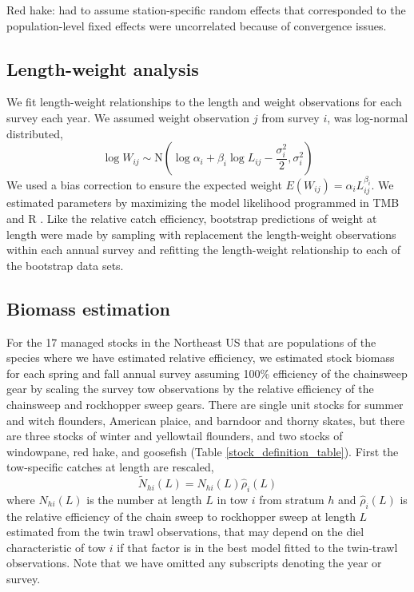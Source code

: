 \documentclass[]{article}
\begin{document}
Red hake: had to assume station-specific random effects that
corresponded to the population-level fixed effects were uncorrelated
because of convergence issues.

\hypertarget{length-weight-analysis}{%
\subsection{Length-weight analysis}\label{length-weight-analysis}}

We fit length-weight relationships to the length and weight observations
for each survey each year. We assumed weight observation \(j\) from
survey \(i\), was log-normal distributed, \begin{equation}\label{wal}
 \log W_{ij} \sim \text{N}\left(\log \alpha_i + \beta_i \log L_{ij} - \frac{\sigma_i^2}{2}, \sigma_i^2\right)
\end{equation} We used a bias correction to ensure the expected weight
\(E(W_{ij})= \alpha_i L_{ij}^{\beta_i}\). We estimated parameters by
maximizing the model likelihood programmed in TMB
\citep{kristensenetal16} and R \citep{R19}. Like the relative catch
efficiency, bootstrap predictions of weight at length were made by
sampling with replacement the length-weight observations within each
annual survey and refitting the length-weight relationship to each of
the bootstrap data sets.

\hypertarget{biomass-estimation}{%
\subsection{Biomass estimation}\label{biomass-estimation}}

For the 17 managed stocks in the Northeast US that are populations of
the species where we have estimated relative efficiency, we estimated
stock biomass for each spring and fall annual survey assuming 100\%
efficiency of the chainsweep gear by scaling the survey tow observations
by the relative efficiency of the chainsweep and rockhopper sweep gears.
There are single unit stocks for summer and witch flounders, American
plaice, and barndoor and thorny skates, but there are three stocks of
winter and yellowtail flounders, and two stocks of windowpane, red hake,
and goosefish (Table \ref{stock_definition_table}). First the
tow-specific catches at length are rescaled, \begin{equation}\label{nal}
\widetilde N_{hi}\left(L\right) = N_{hi}\left(L\right)\widehat \rho_i\left(L\right)
\end{equation} where \(N_{hi}(L)\) is the number at length \(L\) in tow
\(i\) from stratum \(h\) and \(\widehat \rho_i\left(L\right)\) is the
relative efficiency of the chain sweep to rockhopper sweep at length
\(L\) estimated from the twin trawl observations, that may depend on the
diel characteristic of tow \(i\) if that factor is in the best model
fitted to the twin-trawl observations. Note that we have omitted any
subscripts denoting the year or survey.
\end{document}
